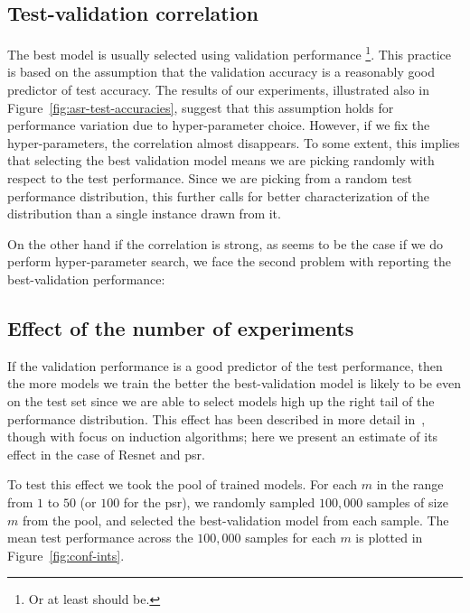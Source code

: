 \documentclass{article}
\newcommand{\asr}{\gls{psr}\xspace}
\begin{document}
\begin{appendices}
\subsection{Test-validation correlation}
\label{sec:tv_corr}

The best model is usually selected using validation performance
\footnote{Or at least should be.}.
This practice is based on the assumption that the validation accuracy is a reasonably good predictor of test accuracy. The results of our experiments, illustrated also in Figure~\ref{fig:asr-test-accuracies}, suggest that this assumption holds for performance variation due to hyper-parameter choice. However, if we fix the hyper-parameters, the correlation almost disappears. To some extent, this implies that selecting the best validation model means we are picking randomly with respect to the test performance. Since we are picking from a random test performance distribution, this further calls for better characterization of the distribution than a single instance drawn from it. 

On the other hand if the correlation is strong, as seems to be the case if we do perform hyper-parameter search, we face the second problem with reporting the best-validation performance:



\subsection{Effect of the number of experiments}



If the validation performance is a good predictor of the test performance, then the more models we train the better the best-validation model is likely to be even on the test set since we are able to select models high up the right tail of the performance distribution. This effect has been described in more detail in~\cite{jensen2000multiple}, though with focus on induction algorithms; here we present an estimate of its effect in the case of Resnet and \asr.

To test this effect we took the pool of trained models. For each $m$ in the range from $1$ to $50$ (or $100$ for the \asr), we randomly sampled $100,000$ samples of size $m$ from the pool, and selected the best-validation model from each sample. The mean test performance across the $100,000$ samples for each $m$ is plotted in Figure~\ref{fig:conf-ints}. %



\end{appendices}
\end{document}
